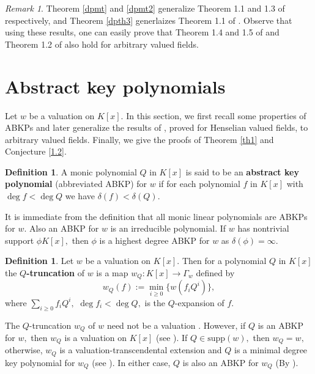 \documentclass[11pt]{amsart}
\theoremstyle{definition}
\newtheorem{definition}[theorem]{Definition}
\theoremstyle{remark}
\newtheorem{remark}[theorem]{Remark}
\numberwithin{equation}{section}
\begin{document}
	\begin{remark}
		Theorem \ref{dpmt} and \ref{dpmt2} generalize Theorem 1.1 and 1.3 of \cite{AK2} respectively, and Theorem \ref{dpth3} generlaizes Theorem 1.1 of \cite{AN2}. Observe that using these results, one can easily prove that Theorem 1.4 and 1.5 of \cite{AK2} and Theorem 1.2 of \cite{AN2} also hold for arbitrary valued fields.
		\end{remark}
		
		\section{Abstract key polynomials}
	  Let $w$ be a valuation on $K[x].$ In this section, we first recall some properties of ABKPs and later generalize the results of \cite{SA3}, proved for Henselian valued fields, to arbitrary valued fields. Finally, we give the proofs of Theorem \ref{th1} and Conjecture \ref{1.2}.
	
	\begin{definition}
		A monic polynomial $Q$ in $K[x]$ is said to be an {\bf abstract key polynomial}  (abbreviated  ABKP) for $w$ if for each polynomial $f$ in $K[x]$  with $\deg f< \deg Q$ we have $\delta(f)<\delta(Q).$
	\end{definition}
	It is immediate from the definition that all monic linear polynomials are ABKPs for $w.$  Also an ABKP for $w$ is an irreducible polynomial. If $w$ has nontrivial support $\phi K[x],$ then $\phi$ is a highest degree ABKP for $w$ as $\delta(\phi)=\infty.$
	\begin{definition}
		Let $w$ be a valuation on $K[x].$ Then
		for a polynomial $Q$ in $K[x]$ the {\bf $Q$-truncation} of $w$ is a map $w_Q:K[x]\longrightarrow \Gamma_w$ defined by 
		$$ w_Q(f):= \min_{i\geq 0}\{w(f_iQ^i)\},$$
		where $\sum_{i\geq 0} f_i Q^i,$ $\deg f_i <\deg Q,$  is the $Q $-expansion of $f.$ 
	\end{definition}
	The $Q$-truncation  $w_Q$  of $w$ need not be a valuation \cite[Example 2.5]{NS}. However,  if $Q$ is an ABKP for $w,$ then $w_Q$ is a valuation on $K[x]$ (see \cite[Proposition 2.6]{NS}). If $Q\in \text{supp}(w),$ then $w_Q=w,$ otherwise, $w_Q$ is a valuation-transcendental extension and $Q$ is a minimal degree key polynomial for $w_Q$ (see \cite[Theorem 2.21]{Ma}). In either case, $Q$ is also an ABKP for $w_Q$ (By \cite[Corollary 2.22]{Ma}).
	
\end{document}
